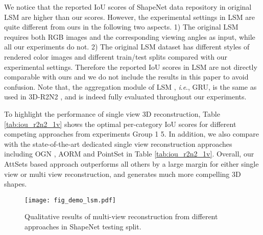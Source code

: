 \documentclass[twocolumn]{svjour3}    \pdfoutput=1
\newcommand{\nickname}{AttSets}
\newcommand{\ie}{\textit{i}.\textit{e}., }
\begin{document}
We notice that the reported IoU scores of ShapeNet data repository in original LSM \citep{Kar2017} are higher than our scores. However, the experimental settings in LSM \citep{Kar2017} are quite different from ours in the following two aspects. 1) The original LSM requires both RGB images and the corresponding viewing angles as input, while all our experiments do not. 2) The original LSM dataset has different styles of rendered color images and different train/test splits compared with our experimental settings. Therefore the reported IoU scores in LSM are not directly comparable with ours and we do not include the results in this paper to avoid confusion. Note that, the aggregation module of LSM \citep{Kar2017}, \ie GRU, is the same as used in 3D-R2N2 \citep{Chan2016}, and is indeed fully evaluated throughout our experiments.

To highlight the performance of single view 3D reconstruction, Table \ref{tab:iou_r2n2_1v} shows the optimal per-category IoU scores for different competing approaches from experiments Group 1  5. In addition, we also compare with the state-of-the-art dedicated single view reconstruction approaches including OGN \citep{Tatarchenko2017}, AORM \citep{Yang2018c} and PointSet \citep{Fan2017} in Table \ref{tab:iou_r2n2_1v}. Overall, our \nickname{} based approach outperforms all others by a large margin for either single view or multi view reconstruction, and generates much more compelling 3D shapes.

\begin{figure*}[h]
\centering
   \texttt{[image: fig\_demo\_lsm.pdf]}
\caption{Qualitative results of multi-view reconstruction from different approaches in ShapeNet testing split.}
\label{fig:mv_demo_lsm}
\vspace{-0.35cm}
\end{figure*}
\end{document}
